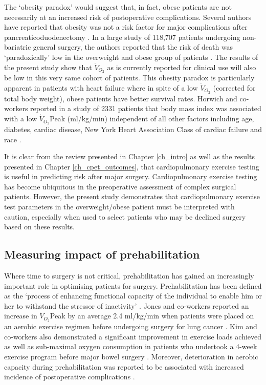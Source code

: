 The `obesity paradox' would suggest that, in fact, obese patients are not necessarily at an increased risk of postoperative complications. 
Several authors have reported that obesity was not a risk factor for major complications after pancreaticoduodenectomy \parencite{khan_does_2010, tsai_impact_2010, balentine_obesity_2011}. 
In a large study of 118,707 patients undergoing non-bariatric general surgery, the authors reported that the risk of death was `paradoxically' low in the overweight and obese group of patients \parencite{mullen_obesity_2009}. 
The results of the present study show that $\dot{V}_{O_2}$ as is currently reported for clinical use will also be low in this very same cohort of patients. 
This obesity paradox is particularly apparent in patients with heart failure where in spite of a low $\dot{V}_{O_2}$ (corrected for total body weight), obese patients have better survival rates. 
Horwich and co-workers reported in a study of 2331 patients that body mass index was associated with a low $\dot{V}_{O_2}$Peak (ml/kg/min) independent of all other factors including age, diabetes, cardiac disease, New York Heart Association Class of cardiac failure and race \parencite{horwich_relationship_2009}.

It is clear from the review presented in Chapter \ref{ch_intro} as well as the results presented in Chapter \ref{ch_cpet_outcomes}, that cardiopulmonary exercise testing is useful in predicting risk after major surgery. 
Cardiopulmonary exercise testing has become ubiquitous in the preoperative assessment of complex surgical patients. 
However, the present study demonstrates that cardiopulmonary exercise test parameters in the overweight/obese patient must be interpreted with caution, especially when used to select patients who may be declined surgery based on these results. 

\subsection{Measuring impact of prehabilitation}

Where time to surgery is not critical, prehabilitation has gained an increasingly important role in optimising patients for surgery.
Prehabilitation has been defined as the `process of enhancing functional capacity of the individual to enable him or her to withstand the stressor of inactivity' \parencite{topp_effect_2002}. 
Jones and co-workers reported an increase in $\dot{V}_{O_2}$Peak by an average 2.4 ml/kg/min when patients were placed on an aerobic exercise regimen before undergoing surgery for lung cancer \parencite{jones_effects_2007}. 
Kim and co-workers also demonstrated a significant improvement in exercise loads achieved as well as sub-maximal oxygen consumption in patients who undertook a 4-week exercise program before major bowel surgery \parencite{kim_responsive_2009}.
Moreover, deterioration in aerobic capacity during prehabilitation was reported to be associated with increased incidence of postoperative complications \parencite{mayo_impact_2011}. 

